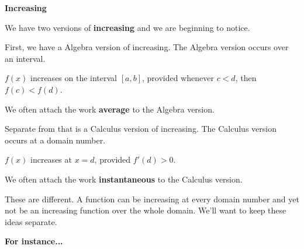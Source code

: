 \documentclass{ximera}
\begin{document}
\begin{warning} \textbf{\textcolor{red!80!black}{Increasing}}



We have two versions of \textbf{increasing} and we are beginning to notice.



First, we have a Algebra version of increasing.  The Algebra version occurs over an interval.  

$f(x)$ increases on the interval $[a,b]$, provided whenever $c < d$, then $f(c) < f(d)$. 

We often attach the work \textbf{average} to the Algebra version.







Separate from that is a Calculus version of increasing. The Calculus version occurs at a domain number.

$f(x)$ increases at $x=d$, provided $f'(d) > 0$. 

We often attach the work \textbf{instantaneous} to the Calculus version.




These are different.  A function can be increasing at every domain number and yet not be an increasing function over the whole domain.  We'll want to keep these ideas separate.




\textbf{For instance...}


\begin{image}
\end{image}
\end{warning}
\end{document}
